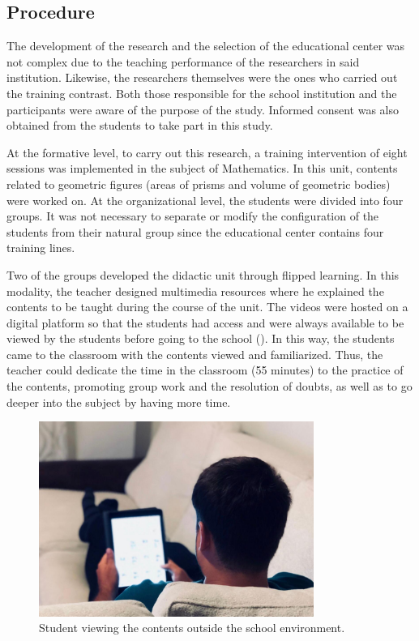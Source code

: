 \documentclass{textolivre}
\begin{document}
\subsection{Procedure}
The development of the research and the selection of the educational center was not complex due to the teaching performance of the researchers in said institution. Likewise, the researchers themselves were the ones who carried out the training contrast. Both those responsible for the school institution and the participants were aware of the purpose of the study. Informed consent was also obtained from the students to take part in this study.

At the formative level, to carry out this research, a training intervention of eight sessions was implemented in the subject of Mathematics. In this unit, contents related to geometric figures (areas of prisms and volume of geometric bodies) were worked on. At the organizational level, the students were divided into four groups. It was not necessary to separate or modify the configuration of the students from their natural group since the educational center contains four training lines.

Two of the groups developed the didactic unit through flipped learning. In this modality, the teacher designed multimedia resources where he explained the contents to be taught during the course of the unit. The videos were hosted on a digital platform so that the students had access and were always available to be viewed by the students before going to the school (). In this way, the students came to the classroom with the contents viewed and familiarized. Thus, the teacher could dedicate the time in the classroom (55 minutes) to the practice of the contents, promoting group work and the resolution of doubts, as well as to go deeper into the subject by having more time.

\begin{figure}[htbp]
 \centering
 \includegraphics[width=0.8\textwidth]{fig-001.jpg}
 \caption{Student viewing the contents outside the school environment.}
 \label{fig1}
\end{figure}
\end{document}
